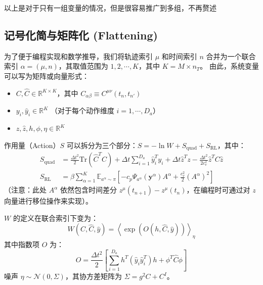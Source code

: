 \documentclass[UTF8]{ctexart}
\begin{document}
    \par 以上是对于只有一组变量的情况，但是很容易推广到多组，不再赘述


\subsection{记号化简与矩阵化 (Flattening)}
为了便于编程实现和数学推导，我们将轨迹索引 $\mu$ 和时间索引 $n$ 合并为一个联合索引 $\alpha = (\mu, n)$，其取值范围为 $1, 2, \cdots, K$，其中 $K = M \times n_T$。
由此，系统变量可以写为矩阵或向量形式：
\begin{itemize}
    \item $C, \hat{C} \in \mathbb{R}^{K \times K}$，其中 $C_{\alpha\beta} \equiv C^{\mu\nu}(t_n, t_{n'})$
    \item $y_i, \hat{y}_i \in \mathbb{R}^K$ （对于每个动作维度 $i=1,\cdots,D_a$）
    \item $z, \hat{z}, h, \phi, \eta \in \mathbb{R}^K$
\end{itemize}

作用量（Action）$S$ 可以拆分为三个部分：$S = -\ln W + S_{\text{quad}} + S_{\text{RL}}$，其中：
\begin{align}
    S_{\text{quad}} &= \frac{\Delta t^2}{2} \text{Tr}(\hat{C}^T C) + \Delta t \sum_{i=1}^{D_a} \hat{y}_i^T y_i + \Delta t \hat{z}^T z - \frac{\Delta t^2}{2 c_v^2} \hat{z}^T C \hat{z} \\
    S_{\text{RL}} &= \beta \sum_{\alpha=1}^K \mathbb{E}_{a^\alpha \sim \pi} \left[ - c_p \Psi_{a^\alpha}(\mathbf{y}^\alpha) A^\alpha + \frac{c_v^2}{2} (A^\alpha)^2 \right]
\end{align}
（注意：此处 $A^\alpha$ 依然包含时间差分 $z^{\mu}(t_{n+1}) - z^\mu(t_n)$，在编程时可通过对 $z$ 向量进行移位操作来实现）。

$W$ 的定义在联合索引下变为：
\begin{equation}
    W(C, \hat{C}, \hat{y}) = \left\langle \exp\left( O(h, \hat{C}, \hat{y}) \right) \right\rangle_{\eta}
\end{equation}
其中指数项 $O$ 为：
\begin{equation}
    O = \frac{\Delta t^2}{2} \left[ \sum_{i=1}^{D_a} h^T (\hat{y}_i \hat{y}_i^T) h + \phi^T \hat{C} \phi \right]
\end{equation}
噪声 $\eta \sim \mathcal{N}(0, \Sigma)$，其协方差矩阵为 $\Sigma = g^2 C + C^I$。
\end{document}
